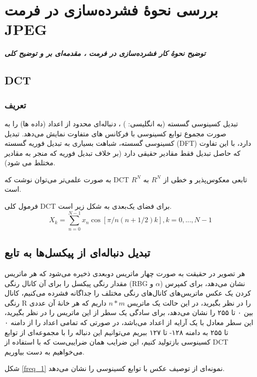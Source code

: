 \chapter{بررسی نحوهٔ فشرده‌سازی در فرمت JPEG}
\noindent
\textbf{
	\textit{
        توضیح نحوهٔ کار فشرده‌سازی در فرمت ، 
        مقدمه‌ای بر  و 
        توضیح کلی 
	}
}
\pagebreak

\section{DCT}

\subsection{
تعریف 
}

تبدیل کسینوسی گسسته (به انگلیسی:
 )
 ، دنباله‌ای محدود از اعداد (داده ها) را به‌ صورت مجموع توابع کسینوسی با فرکانس های متفاوت نمایش می‌دهد.
 تبدیل کسینوسی گسسته، شباهت بسیاری به تبدیل فوریه گسسته (DFT) دارد، با این تفاوت که حاصل تبدیل فقط مقادیر حقیقی دارد (بر خلاف تبدیل فوریه که منجر به مقادیر مختلط می شود).

 به صورت علمی‌تر می‌توان نوشت که 
 DCT 
 تابعی معکوس‌پذیر و خطی از 
 $R^N$ 
 به 
 $R^N$
 است.

 فرمول کلی DCT 
 برای فضای یک‌بعدی به شکل زیر است.
\cite{dct}
 \begin{equation}
 X_k = \sum_{n = 0}^{N - 1} x_n \cos [\pi / n  (n + 1/2)k]
 , k = 0, ..., N - 1
 \end{equation}

 \section{تبدیل دنباله‌ای از پیکسل‌ها به تابع}
هر تصویر در حقیقت به صورت چهار ماتریس دوبعدی ذخیره می‌شود که هر ماتریس مقدار رنگی پیکسل را برای آن کانال رنگی
(RBG و $\alpha$)
نشان می‌دهد، برای کمپرس کردن یک عکس ماتریس‌های کانال‌های رنگی مختلف را جداگانه فشرده می‌کنیم، کانال رنگی R 
را در نظر بگیرید، در این حالت یک ماتریس 
$n * m$ 
داریم که هر خانهٔ آن عددی بین ۰ تا ۲۵۵ را نشان می‌دهد، برای سادگی یک سطر از این ماتریس را در نظر بگیرید، این سطر معادل با یک 
آرایه از اعداد می‌باشد، در صورتی که تمامی اعداد را از دامنه ۰ تا ۲۵۵ به دامنه ۱۲۸- تا ۱۲۷ ببریم می‌توانیم این دنباله را با مجموعه‌ای از 
توابع کسینوسی بازتولید کنیم، این ضرایب همان ضرایبی‌ست که با استفاده از DCT 
می‌خواهیم به دست بیاوریم.

شکل
\ref{freq_1}
نمونه‌ای از توصیف عکس با توابع کسینوسی را نشان می‌دهد.

